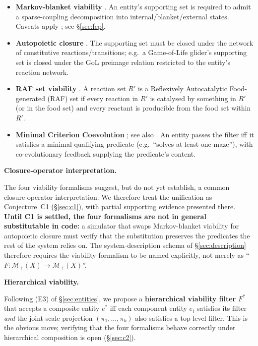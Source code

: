 \documentclass[journal]{IEEEtran}
\theoremstyle{plain}
\theoremstyle{definition}
\theoremstyle{plain}
\newcounter{topic}[subsection]
\newcommand{\topic}[1]{%
  \refstepcounter{topic}%
  \par\smallskip\noindent\textbf{#1.}\ }
\newcommand{\Mplus}{\mathcal{M}_{+}}
\begin{document}
\begin{itemize}[leftmargin=1.5em,itemsep=2pt]
  \item \textbf{Markov-blanket viability} \cite{friston2013life,kirchhoff2018blankets}.
    An entity's supporting set is
    required to admit a sparse-coupling decomposition into
    internal/blanket/external states. Caveats apply
    \cite{aguilera2022particular,biehl2021critique}; see \S\ref{sec:fep}.
  \item \textbf{Autopoietic closure} \cite{maturana1980autopoiesis,beer2014glider,beer2015autopoiesis,beer2020origin}.
    The supporting set must be closed under the network of
    constitutive reactions/transitions; e.g.\ a Game-of-Life glider's
    supporting set is closed under the GoL preimage relation restricted to
    the entity's reaction network.
  \item \textbf{RAF set viability} \cite{hordijk2004raf,hordijk2015algorithms}.
    A reaction set $R'$ is a Reflexively Autocatalytic
    Food-generated (RAF) set if every reaction in $R'$ is catalysed by
    something in $R'$ (or in the food set) and every reactant is producible
    from the food set within $R'$.
  \item \textbf{Minimal Criterion Coevolution} \cite{brant2017mcc}; see also
    \cite{lehman2011novelty}. An entity passes the filter iff it
    satisfies a minimal qualifying predicate (e.g.\ ``solves at least one
    maze''), with co-evolutionary feedback supplying the predicate's content.
\end{itemize}

\topic{Closure-operator interpretation}

The four viability formalisms suggest, but do not yet establish, a common
closure-operator interpretation. We therefore treat the unification as
Conjecture~C1 (\S\ref{sec:c1}), with partial supporting evidence presented
there. \textbf{Until C1 is settled, the four formalisms are not in general
substitutable in code:} a simulator that swaps Markov-blanket viability for
autopoietic closure must verify that the substitution preserves the
predicates the rest of the system relies on. The system-description schema
of \S\ref{sec:description} therefore requires the viability formalism to be
named explicitly, not merely as ``$F : \Mplus(X) \to \Mplus(X)$''.

\topic{Hierarchical viability}

Following (E3) of \S\ref{sec:entities}, we propose a \textbf{hierarchical
viability filter} $F^*$ that accepts a composite entity $e^*$ iff each
component entity $e_i$ satisfies its filter \emph{and} the joint scale
projection $(\pi_1,\dots,\pi_k)$ also satisfies a top-level filter. This is
the obvious move; verifying that the four formalisms behave correctly under
hierarchical composition is open (\S\ref{sec:c2}).
\end{document}
